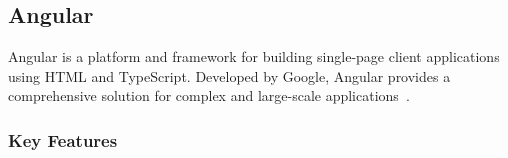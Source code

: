 




\subsection{Angular}

Angular is a platform and framework for building single-page client applications using HTML and TypeScript. Developed by Google, Angular provides a comprehensive solution for complex and large-scale applications~\cite{angular-io}.

\subsubsection{Key Features}

